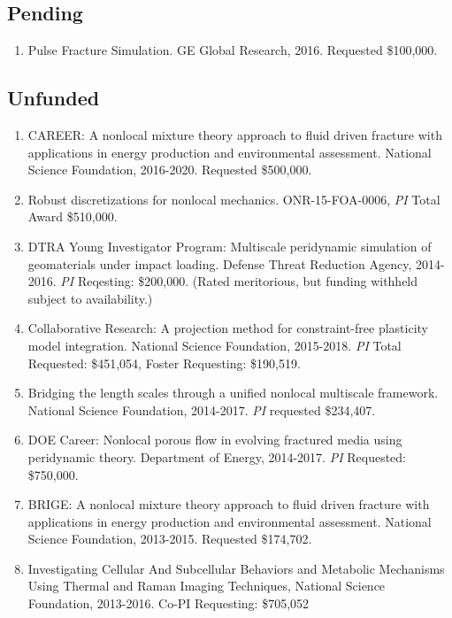 \subsection*{Pending}

\begin{enumerate}
   \item Pulse Fracture Simulation. GE Global Research, 2016. Requested \$100,000.
\end{enumerate}

\subsection*{Unfunded}

\begin{enumerate}
    \item CAREER: A nonlocal mixture theory approach to fluid driven fracture with applications in energy production and environmental assessment. National Science Foundation, 2016-2020. Requested \$500,000.
    \item Robust discretizations for nonlocal mechanics. ONR-15-FOA-0006, \textit{PI} Total Award {\$}510,000.
  \item DTRA Young Investigator Program: Multiscale peridynamic simulation of geomaterials under impact loading. Defense Threat Reduction Agency, 2014-2016. \textit{PI} Reqesting: \$200,000. (Rated meritorious, but funding withheld subject to availability.)
  \item Collaborative Research: A projection method for constraint-free plasticity model integration. National Science Foundation, 2015-2018. \textit{PI} Total Requested: \$451,054, Foster Requesting: \$190,519.
    \item Bridging the length scales through a unified nonlocal multiscale framework. National Science Foundation, 2014-2017. \textit{PI} requested \$234,407.
    \item DOE Career: Nonlocal porous flow in evolving fractured media using peridynamic theory. Department of Energy, 2014-2017. \textit{PI} Requested: \$750,000. 
    \item BRIGE: A nonlocal mixture theory approach to fluid driven fracture with applications in energy production and environmental assessment. National Science Foundation, 2013-2015. Requested \$174,702.
    \item  Investigating Cellular And Subcellular Behaviors and Metabolic Mechanisms Using Thermal and Raman Imaging Techniques, National Science Foundation, 2013-2016.  Co-PI Requesting: \$705,052

\end{enumerate}
